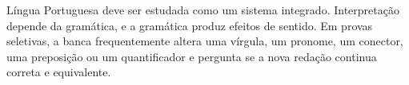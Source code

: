 \begin{resumo}
Língua Portuguesa deve ser estudada como um sistema integrado. Interpretação depende da gramática, e a gramática produz efeitos de sentido. Em provas seletivas, a banca frequentemente altera uma vírgula, um pronome, um conector, uma preposição ou um quantificador e pergunta se a nova redação continua correta e equivalente.
\end{resumo}
